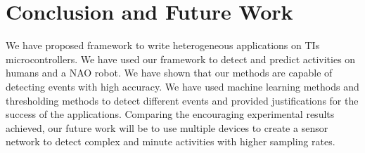\documentclass[letterpaper]{article}
\begin{document}
\section{Conclusion and Future Work}

We have proposed framework to write heterogeneous applications on TIs microcontrollers. We have used 
our framework to detect and predict activities on humans and a NAO robot. We 
have shown that our methods are capable of detecting events with high accuracy. We have used 
machine learning methods and thresholding methods to detect different events and provided 
justifications for the success of the applications. Comparing the encouraging experimental results 
achieved, our future work will be to use multiple devices to create a sensor network to detect 
complex and minute activities with higher sampling rates.  



\end{document}
